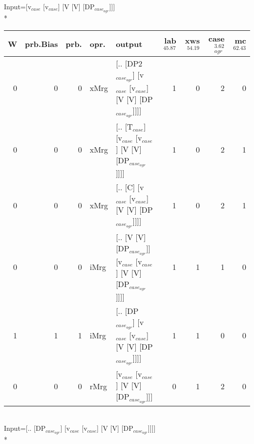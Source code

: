 \begingroup\scriptsize Input=[v$_{case}$ [v$_{case}$] [V [V] [DP$_{case_{agr}}$]]]\\*
\begin{tabularx}{\linewidth}{rrrlXrrrr}
\hline
   W &   prb.Bias &   prb. & opr.   & output                                                             &   lab$^{45.87}$ &   xws$^{54.19}$ &   case$_{agr}^{3.62}$ &   mc$^{62.43}$ \\
\hline
   0 &       0 &   0 & xMrg & [.. [DP2$_{case_{agr}}$] [v$_{case}$ [v$_{case}$] [V [V] [DP$_{case_{agr}}$]]]]        &             1 &             0 &                  2 &            0 \\
   0 &       0 &   0 & xMrg & [.. [T$_{case}$] [v$_{case}$ [v$_{case}$] [V [V] [DP$_{case_{agr}}$]]]]              &             1 &             0 &                  2 &            1 \\
   0 &       0 &   0 & xMrg & [.. [C] [v$_{case}$ [v$_{case}$] [V [V] [DP$_{case_{agr}}$]]]]                   &             1 &             0 &                  2 &            1 \\
   0 &       0 &   0 & iMrg & [.. [V [V] [DP$_{case_{agr}}$]] [v$_{case}$ [v$_{case}$] [V [V] [DP$_{case_{agr}}$]]]] &             1 &             1 &                  1 &            0 \\
   1 &       1 &   1 & iMrg & [.. [DP$_{case_{agr}}$] [v$_{case}$ [v$_{case}$] [V [V] [DP$_{case_{agr}}$]]]]         &             1 &             1 &                  0 &            0 \\
   0 &       0 &   0 & rMrg & [v$_{case}$ [v$_{case}$] [V [V] [DP$_{case_{agr}}$]]]                            &             0 &             1 &                  2 &            0 \\
\hline
\end{tabularx}\endgroup\\
\begingroup\scriptsize Input=[.. [DP$_{case_{agr}}$] [v$_{case}$ [v$_{case}$] [V [V] [DP$_{case_{agr}}$]]]]\\*
